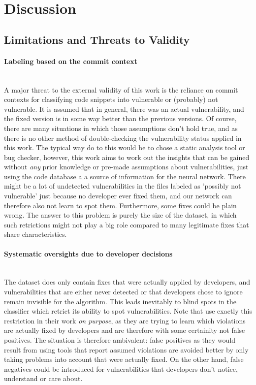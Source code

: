 \documentclass[
	a4paper,
	pagesize,
	pdftex,
	12pt,
	twoside, %
	BCOR=5mm, %
	ngerman,
	fleqn,
	final,
	]{scrartcl}
\begin{document}
\newpage
\section{Discussion}

\subsection{Limitations and Threats to Validity}

\paragraph{Labeling based on the commit context}\mbox{}\\
A major threat to the external validity of this work is the reliance on commit contexts for classifying code snippets into vulnerable or (probably) not vulnerable. It is assumed that in general, there was an actual vulnerability, and the fixed version is in some way better than the previous versions. Of course, there are many situations in which those assumptions don't hold true, and as there is no other method of double-checking the vulnerability status applied in this work. The typical way do to this would be to chose a static analysis tool or bug checker, however, this work aims to work out the insights that can be gained without \textit{any} prior knowledge or pre-made assumptions about vulnerabilities, just using the code database a a source of information for the neural network. There might be a lot of undetected vulnerabilities in the files labeled as 'possibly not vulnerable' just because no developer ever fixed them, and our network can therefore also not learn to spot them. Furthermore, some fixes could be plain wrong. The answer to this problem is purely the size of the dataset, in which such retrictions might not play a big role compared to many legitimate fixes that share characteristics.
\paragraph{Systematic oversights due to developer decisions}\mbox{}\\
The dataset does only contain fixes that were actually applied by developers, and vulnerabilities that are either never detected or that developers chose to ignore remain invisible for the algorithm. This leads inevitably to blind spots in the classifier which retrict its ability to spot vulnerabilities. Note that \cite{Liu.2018} use exactly this restriction in their work \textit{on purpose}, as they are trying to learn which violations are actually fixed by developers and are therefore with some certainity not false positives. The situation is therefore ambivalent: false positives as they would result from using tools that report assumed violations are avoided better by only taking problems into account that were actually fixed. On the other hand, false negatives could be introduced for vulnerabilities that developers don't notice, understand or care about.
\end{document}
